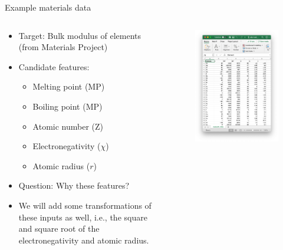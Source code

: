 \documentclass[aspectratio=169]{beamer}
\begin{document}
\begin{frame}{Example materials data}
    \begin{columns}
    \begin{column}{0.6\textwidth}
        \begin{itemize}
            \item Target: Bulk modulus of elements (from Materials Project)
            \item Candidate features:
            \begin{itemize}
                \item Melting point (MP)
                \item Boiling point (MP)
                \item Atomic number (Z)
                \item Electronegativity ($\chi$)
                \item Atomic radius ($r$)
            \end{itemize}
            \item Question: Why these features?
            \item We will add some transformations of these inputs as well, i.e., the square and square root of the electronegativity and atomic radius.
    \end{itemize}
    \end{column}
    \begin{column}{0.3\textwidth}
        \begin{figure}
        \centering
        \includegraphics[width=\textwidth]{figures/elementdata.png}

\end{figure}
\end{column}
\end{columns}
\end{frame}
\end{document}
